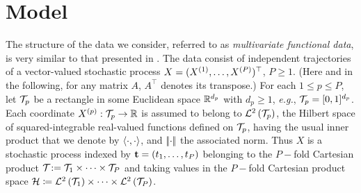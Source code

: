 \section{Model} %
\label{sec:model}

The structure of the data we consider, referred to as \emph{multivariate functional data}, is very similar to that presented in \cite{happMultivariateFunctionalPrincipal2018a}. The data consist of independent trajectories of a vector-valued stochastic process $X = (X^{(1)}, \dots, X^{(P)})^\top$, $P\geq 1$. (Here and in the following, for any matrix $A$, $A^\top$ denotes its transpose.) For each $1 \leq p \leq P$, let $\mathcal{T}_{p}$ be a rectangle in some Euclidean space $\mathbb{R}^{d_p}$ with $d_p \geq 1$, \emph{e.g.}, $\mathcal{T}_{p} = [0,1]^{d_p}$. Each coordinate $X^{(p)} : \mathcal{T}_{p} \rightarrow \mathbb{R}$ is assumed to belong to  $\mathcal{L}^{2}\left(\mathcal{T}_{p}\right)$, the Hilbert space of squared-integrable real-valued functions defined on $\mathcal{T}_{p}$, having the usual inner product that we denote by $\langle\cdot, \cdot\rangle$, and $\left|\!\left|\cdot\right|\!\right|$ the associated norm. Thus $X$ is a stochastic process indexed by $\mathbf{t} = (t_1, \ldots, t_P)$ belonging to the $P-$fold Cartesian product $\mathcal{T}_{} : =\mathcal{T}_{1} \times \cdots \times \mathcal{T}_{P}$ and taking values in the $P-$fold Cartesian product space $\mathcal{H} \coloneqq \mathcal{L}^{2}\left(\mathcal{T}_{1}\right) \times \dots \times \mathcal{L}^{2}\left(\mathcal{T}_{P}\right)$. 

